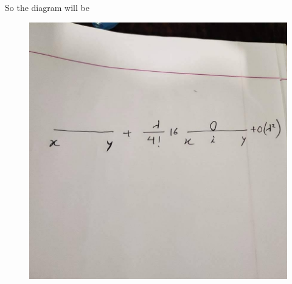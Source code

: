 \documentclass[12pt, letterpaper]{article}
\newcommand*{\1}{\hspace{1pt}}
\begin{document}
    So the diagram will be 
    \begin{figure}[h]
    \centering
    \includegraphics[scale=.3]{rpic}
    \end{figure}
\end{document}
